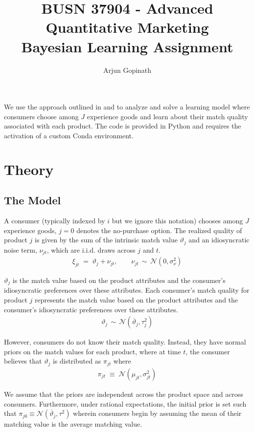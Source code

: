 \documentclass[11pt]{article}
\title{\LARGE \vspace{-1.5cm}\textbf{BUSN 37904 - Advanced Quantitative Marketing \\ Bayesian Learning Assignment}}
\author{\Large Arjun Gopinath}
\newcommand{\N}{\mathcal{N}}
\begin{document}
\maketitle

\noindent We use the approach outlined in \citet{erdem_decision-making_1996} and \citet{crawford_uncertainty_2005} to analyze and solve a learning model where consumers choose among $J$ experience goods and learn about their match quality associated with each product. The code is provided in Python and requires the activation of a custom Conda environment.

\section{Theory}
\subsection*{The Model}
A consumer (typically indexed by $i$ but we ignore this notation) chooses among $J$ experience goods, $j=0$ denotes the no-purchase option. The realized quality of product $j$ is given by the sum of the intrinsic match value $\vartheta_{j}$ and an idiosyncratic noise term, $\nu_{j t}$, which are i.i.d. draws across $j$ and $t$.
\begin{gather*}
\xi_{j t} \; = \; \vartheta_{j}+\nu_{j t}, \qquad \nu_{j t} \, \sim \, \N\left(0, \sigma_{\nu}^{2}\right)
\end{gather*}

\noindent $\vartheta_{j}$ is the match value based on the product attributes and the consumer's idiosyncratic preferences over these attributes. Each consumer's match quality for product $j$ represents the match value based on the product attributes and the consumer's idiosyncratic preferences over these attributes.  
\begin{gather*}
    \vartheta_{j} \, \sim \, \N \left( \overline{\vartheta}_j, \tau^2_j \right)
\end{gather*}

\noindent However, consumers do not know their match quality. Instead, they have normal priors on the match values for each product, where at time $t$, the consumer believes that $\vartheta_j$ is distributed as $\pi_{jt}$ where
\begin{gather*}
\pi_{jt} \; \equiv \; \N\left(\mu_{j t}, \sigma_{jt}^{2}\right)
\end{gather*}

\noindent We assume that the priors are independent across the product space and across consumers. Furthermore, under rational expectations, the initial prior is set such that $\pi_{j 0} \equiv \N\left(\overline{\vartheta}_{j}, \tau^{2}\right)$ wherein consumers begin by assuming the mean of their matching value is the average matching value.\\
\end{document}
